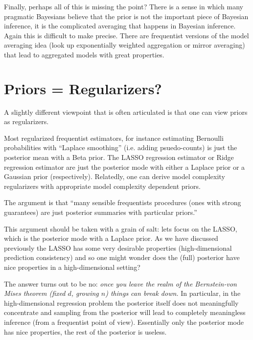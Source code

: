 \documentclass[twoside,12pt]{article}
\begin{document}
Finally, perhaps all of this is missing the point? There is a sense in which many pragmatic Bayesians believe that the prior is not the important piece of Bayesian inference, it is the complicated averaging that happens in Bayesian inference. Again this is difficult to make precise. There are frequentist versions of the model averaging idea (look up exponentially weighted aggregation or mirror averaging) that lead to aggregated models with great properties.


\section{Priors = Regularizers?}
A slightly different viewpoint that is often articulated is that one can view priors as regularizers.

Most regularized frequentist estimators, for instance estimating Bernoulli probabilities with ``Laplace smoothing'' (i.e. adding psuedo-counts) is just the posterior mean with a Beta prior.
The LASSO regression estimator or Ridge regression estimator are just the posterior mode with either a Laplace prior or a Gaussian prior (respectively). 
Relatedly, one can derive model complexity regularizers with appropriate model complexity dependent priors.

The argument is that ``many sensible frequentists procedures (ones with strong guarantees) are just posterior summaries with particular priors.''

This argument should be taken with a grain of salt: lets focus on the LASSO, which is the posterior mode with a Laplace prior. As we have discussed previously the LASSO has some very desirable properties (high-dimensional prediction consistency) and so one might wonder does the (full) posterior have nice properties in a high-dimensional setting? 

The answer turns out to be no: \emph{once you leave the realm of the Bernstein-von Mises theorem (fixed $d$, growing $n$) things can break down.} In particular, in the high-dimensional regression problem the posterior itself does not meaningfully concentrate and sampling from the posterior will lead to completely meaningless inference (from a frequentist point of view). Essentially only the posterior mode has nice properties, the rest of the posterior is useless.
\end{document}
